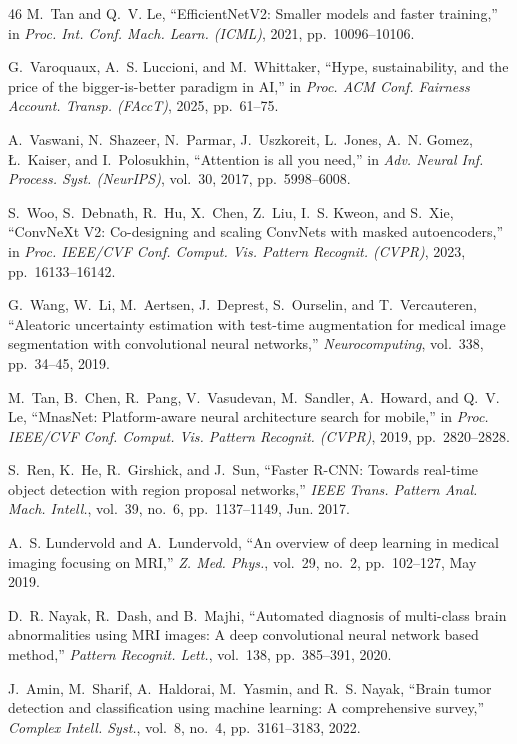 \begin{thebibliography}{46}
M.~Tan and Q.~V. Le, ``EfficientNetV2: Smaller models and faster training,'' in \emph{Proc. Int. Conf. Mach. Learn. (ICML)}, 2021, pp.~10096--10106.

G.~Varoquaux, A.~S. Luccioni, and M.~Whittaker, ``Hype, sustainability, and the price of the bigger-is-better paradigm in AI,'' in \emph{Proc. ACM Conf. Fairness Account. Transp. (FAccT)}, 2025, pp.~61--75. 

A.~Vaswani, N.~Shazeer, N.~Parmar, J.~Uszkoreit, L.~Jones, A.~N. Gomez, {\L}.~Kaiser, and I.~Polosukhin, ``Attention is all you need,'' in \emph{Adv. Neural Inf. Process. Syst. (NeurIPS)}, vol.~30, 2017, pp.~5998--6008.

S.~Woo, S.~Debnath, R.~Hu, X.~Chen, Z.~Liu, I.~S. Kweon, and S.~Xie, ``ConvNeXt V2: Co-designing and scaling ConvNets with masked autoencoders,'' in \emph{Proc. IEEE/CVF Conf. Comput. Vis. Pattern Recognit. (CVPR)}, 2023, pp.~16133--16142.

G.~Wang, W.~Li, M.~Aertsen, J.~Deprest, S.~Ourselin, and T.~Vercauteren, ``Aleatoric uncertainty estimation with test-time augmentation for medical image segmentation with convolutional neural networks,'' \emph{Neurocomputing}, vol.~338, pp.~34--45, 2019. 

M.~Tan, B.~Chen, R.~Pang, V.~Vasudevan, M.~Sandler, A.~Howard, and Q.~V. Le, ``MnasNet: Platform-aware neural architecture search for mobile,'' in \emph{Proc. IEEE/CVF Conf. Comput. Vis. Pattern Recognit. (CVPR)}, 2019, pp.~2820--2828.

S.~Ren, K.~He, R.~Girshick, and J.~Sun, ``Faster R-CNN: Towards real-time object detection with region proposal networks,'' \emph{IEEE Trans. Pattern Anal. Mach. Intell.}, vol.~39, no.~6, pp.~1137--1149, Jun. 2017. 

A.~S. Lundervold and A.~Lundervold, ``An overview of deep learning in medical imaging focusing on MRI,'' \emph{Z. Med. Phys.}, vol.~29, no.~2, pp.~102--127, May 2019. 

D.~R. Nayak, R.~Dash, and B.~Majhi, ``Automated diagnosis of multi-class brain abnormalities using MRI images: A deep convolutional neural network based method,'' \emph{Pattern Recognit. Lett.}, vol.~138, pp.~385--391, 2020. 

J.~Amin, M.~Sharif, A.~Haldorai, M.~Yasmin, and R.~S. Nayak, ``Brain tumor detection and classification using machine learning: A comprehensive survey,'' \emph{Complex Intell. Syst.}, vol.~8, no.~4, pp.~3161--3183, 2022. 


\end{thebibliography}
